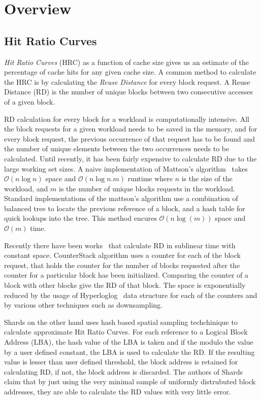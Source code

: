 \section{Overview}

\subsection{Hit Ratio Curves}

\emph{Hit Ratio Curves} (HRC) as a function of cache size gives us an estimate of the percentage of cache hits for any given cache size. A common method to calculate the HRC is by calculating the \emph{Reuse Distance} for every block request. A Reuse Distance (RD) is the number of unique blocks between two consecutive accesses of a given block.

RD calculation for every block for a workload is computationally intensive. All the block requests for a given workload needs to be saved in the memory, and for every block request, the previous occurrence of that request has to be found and the number of unique elements between the two occurrences needs to be calculated. Until recently, it has been fairly expensive to calculate RD due to the large working set sizes. A naive implementation of Mattson's algorithm~\cite{mattson_evaluation_1970} takes $\mathcal{O}(n\log{n})$ space and $\mathcal{O}(n\log{n.m})$ runtime where $n$ is the size of the workload, and $m$ is the number of unique blocks requests in the workload. Standard implementations of the mattson's algorithm use a combination of balanced tree to locate the previous reference of a block, and a hash table for quick lookups into the tree. This method encures $\mathcal{O}(n\log(m))$ space and $\mathcal{O}(m)$ time.

Recently there have been works~\cite{niu_parda:_2012, waldspurger_efficient_2015, wires_characterizing_2014} that calculate RD in sublinear time with constant space. CounterStack algorithm uses a counter for each of the block request, that holds the counter for the number of blocks requested after the counter for a particular block has been initialized. Comparing the counter of a block with other blocks give the RD of that block. The space is exponentially reduced by the usage of Hyperloglog~\cite{flajolet_hyperloglog:_2007} data structure for each of the counters and by various other techniques such as downsampling.

Shards on the other hand uses hash based spatial sampling techchinique to calculate approximate Hit Ratio Curves. For each reference to a Logical Block Address (LBA), the hash value of the LBA is taken and if the modulo the value by a user defined constant, the LBA is used to calculate the RD. If the resulting value is lesser than user defined threshold, the block address is retained for calculating RD, if not, the block address is discarded. The authors of Shards claim that by just using the very minimal sample of uniformly distrubuted block addresses, they are able to calculate the RD values with very little error.

